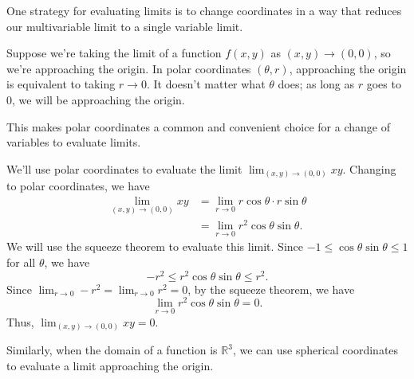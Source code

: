 \documentclass{ximera}
\begin{document}
One strategy for evaluating limits is to change coordinates in a way that reduces our multivariable limit to a single variable limit.

Suppose we're taking the limit of a function $f(x,y)$ as $(x,y)\rightarrow (0,0)$, so we're approaching the origin. In polar coordinates $(\theta, r)$, approaching the origin is equivalent to taking $r\rightarrow 0$. It doesn't matter what $\theta$ does; as long as $r$ goes to $0$, we will be approaching the origin.

\begin{image}
\end{image}

This makes polar coordinates a common and convenient choice for a change of variables to evaluate limits.

\begin{example}
We'll use polar coordinates to evaluate the limit $\lim_{(x,y)\rightarrow (0,0)}xy$. Changing to polar coordinates, we have
\begin{align*}
\lim_{(x,y)\rightarrow (0,0)}xy &= \lim_{r\rightarrow 0} r\cos\theta \cdot r\sin\theta\\
&= \lim_{r\rightarrow 0} r^2\cos\theta\sin\theta.
\end{align*}
We will use the squeeze theorem to evaluate this limit. Since $-1\leq\cos\theta\sin\theta\leq 1$ for all $\theta$, we have
\[
-r^2\leq r^2\cos\theta\sin\theta\leq r^2.
\]
Since $\lim_{r\rightarrow 0} -r^2 = \lim_{r\rightarrow 0} r^2=0$, by the squeeze theorem, we have
\[
\lim_{r\rightarrow 0} r^2\cos\theta\sin\theta = 0.
\]
Thus, $\lim_{(x,y)\rightarrow (0,0)}xy = 0$.
\end{example}

Similarly, when the domain of a function is $\mathbb{R}^3$, we can use spherical coordinates to evaluate a limit approaching the origin.
\end{document}
